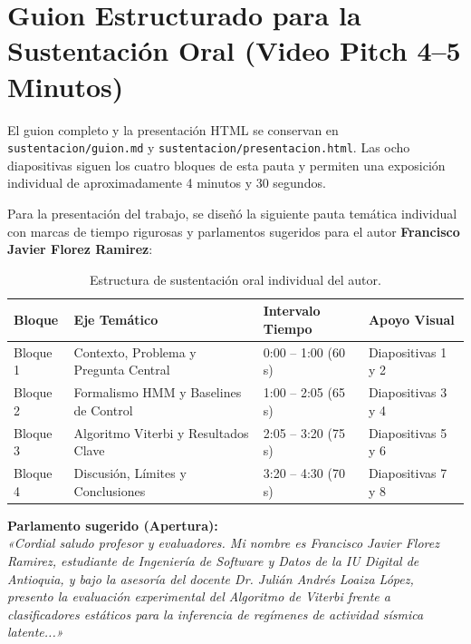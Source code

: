 \documentclass[11pt,a4paper]{article}
\begin{document}
\section{Guion Estructurado para la Sustentación Oral (Video Pitch 4--5 Minutos)}

El guion completo y la presentación HTML se conservan en \texttt{sustentacion/guion.md} y \texttt{sustentacion/presentacion.html}. Las ocho diapositivas siguen los cuatro bloques de esta pauta y permiten una exposición individual de aproximadamente 4 minutos y 30 segundos.

Para la presentación del trabajo, se diseñó la siguiente pauta temática individual con marcas de tiempo rigurosas y parlamentos sugeridos para el autor \textbf{Francisco Javier Florez Ramirez}:

\begin{table}[htbp]
\centering
\small
\caption{Estructura de sustentación oral individual del autor.}
\begin{tabular}{p{2.2cm}p{4.5cm}p{2.8cm}p{3.5cm}}
\toprule
\textbf{Bloque} & \textbf{Eje Temático} & \textbf{Intervalo Tiempo} & \textbf{Apoyo Visual} \\
\midrule
Bloque 1 & Contexto, Problema y Pregunta Central & 0:00 – 1:00 (60 s) & Diapositivas 1 y 2 \\
Bloque 2 & Formalismo HMM y Baselines de Control & 1:00 – 2:05 (65 s) & Diapositivas 3 y 4 \\
Bloque 3 & Algoritmo Viterbi y Resultados Clave & 2:05 – 3:20 (75 s) & Diapositivas 5 y 6 \\
Bloque 4 & Discusión, Límites y Conclusiones & 3:20 – 4:30 (70 s) & Diapositivas 7 y 8 \\
\bottomrule
\end{tabular}
\end{table}

\noindent \textbf{Parlamento sugerido (Apertura):} \\
\textit{«Cordial saludo profesor y evaluadores. Mi nombre es Francisco Javier Florez Ramirez, estudiante de Ingeniería de Software y Datos de la IU Digital de Antioquia, y bajo la asesoría del docente Dr. Julián Andrés Loaiza López, presento la evaluación experimental del Algoritmo de Viterbi frente a clasificadores estáticos para la inferencia de regímenes de actividad sísmica latente...»}
\end{document}
